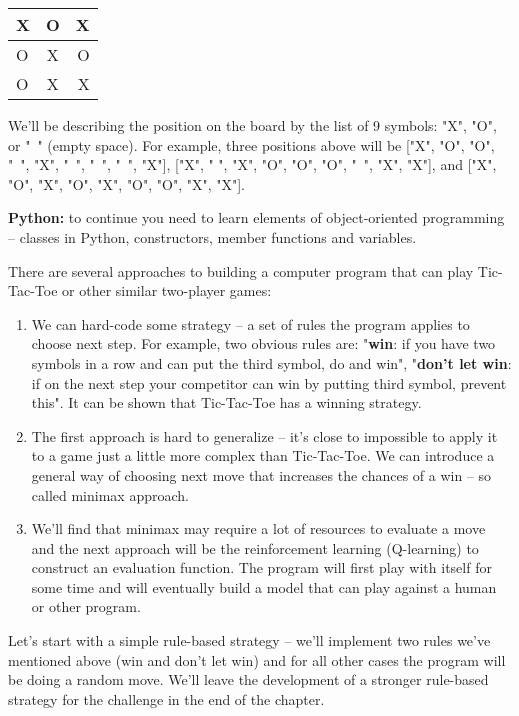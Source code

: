 \begin{center}
\begin{tabular}{ l | c | r }
    X & O & X \\ \hline
    O & X & O \\ \hline
    O & X & X  \\
  \end{tabular}
\end{center}


We'll be describing the position on the board by the list of 9 symbols:
"X", "O", or "\ " (empty space). For example, three positions above will be
["X", "O", "O", "\ ", "X", "\ ", "\ ", "\ ", "X"],
["X", " ", "X", "O", "O", "O", "\ ", "X", "X"], and
["X", "O", "X", "O", "X", "O", "O", "X", "X"].

\begin{tcolorbox}
\textbf{Python:} to continue you need to learn elements of
object-oriented programming -- classes in Python, constructors, member
functions and variables.
\end{tcolorbox}

There are several approaches to building a computer program that can
play Tic-Tac-Toe or other similar two-player games:

\begin{enumerate}
\item We can hard-code some strategy -- a set of rules the program
applies to choose next step. For example, two obvious rules are:
"\textbf{win}: if you have two symbols in a row and
can put the third symbol, do and win",
"\textbf{don't let win}: if on the next step your competitor
can win by putting third symbol, prevent this".
It can be shown that Tic-Tac-Toe has a winning strategy.
\item The first approach is hard to generalize -- it's close to impossible
to apply it to a game
just a little more complex than Tic-Tac-Toe. We can introduce
a general way of choosing next move that increases the chances of
a win -- so called minimax approach.
\item We'll find that minimax may require a lot of resources to evaluate
a move and the next approach will be the reinforcement learning
(Q-learning) to construct an evaluation function. The program
will first play with itself for some time and will eventually build a
model that can play against a human or other program.
\end{enumerate}

Let's start with a simple rule-based strategy -- we'll
implement two rules we've mentioned above (win and don't let win)
and for all other cases the program will be doing a random move.
We'll leave the development of a stronger rule-based strategy for
the challenge in the end of the chapter.


